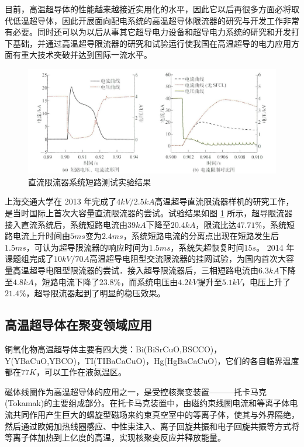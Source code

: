 \documentclass[UTF8, twocolumn]{ctexart}
\begin{document}
    目前，高温超导体的性能越来越接近实用化的水平，因此它以后再很多方面必将取代低温超导体，因此开展面向配电系统的高温超导体限流器的研究与开发工作非常有必要。同时还可以为以后从事其它超导电力设备和超导电力系统的研究和开发打下基础，并通过高温超导限流器的研究和试验运行使我国在高温超导的电力应用方面有重大技术突破并达到国际一流水平\cite{肖立业1999超导限流器}。

    \begin{figure}[ht]
        \centering
        \includegraphics[scale=1]{image/直流限流器系统短路测试实验结果.jpg}
        \caption{直流限流器系统短路测试实验结果}
        \label{fig:image5}
    \end{figure}

    上海交通大学在 2013 年完成了$4kV/2.5kA$高温超导直流限流器样机的研究工作，是当时国际上首次大容量直流限流器的尝试。试验结果如图 \ref{fig:image5} 所示，超导限流器接入直流系统后，系统短路电流由$39kA$下降至$20.4kA$，限流比达$47.71\%$，系统短路电流上升时间由$5ms$变为$2.4ms$，系统短路电流的分离点出现在短路发生后$1.5ms$，可认为超导限流器的响应时间为$1.5ms$，系统失超恢复时间$15s$。 2014 年课题组完成了$10kV/70A$高温超导电阻型交流限流器的挂网试验，为国内首次大容量高温超导电阻型限流器的尝试．接入超导限流器后，三相短路电流由$6.3kA$下降至$4.8kA$，短路电流下降了$23.8\%$，而系统电压由$4.2kV$提升至$5.1kV$，电压上升了$21.4\%$，超导限流器起到了明显的稳压效果\cite{金之俭2018二代高温超导材料的应用技术与发展综述}。

    \subsection{高温超导体在聚变领域应用}

    铜氧化物高温超导体主要有四大类：Bi(BiSrCuO,BSCCO)，Y(YBaCuO,YBCO)，TI(TIBaCaCuO)，Hg(HgBaCaCuO)，它们的各自临界温度都在$77K$，可以工作在液氮温区。\cite{孙林煜2012第二代高温超导体研究与在聚变领域应用前景}

    磁体线圈作为高温超导体的应用之一，是受控核聚变装置———托卡马克(Tokamak)的主要组成部分。在托卡马克装置中，由磁约束线圈电流和等离子体电流共同作用产生巨大的螺旋型磁场来约束真空室中的等离子体，使其与外界隔绝，然后通过欧姆加热线圈感应、中性束注入、离子回旋共振和电子回旋共振等方式将等离子体加热到上亿度的高温，实现核聚变反应并释放能量。
\end{document}
